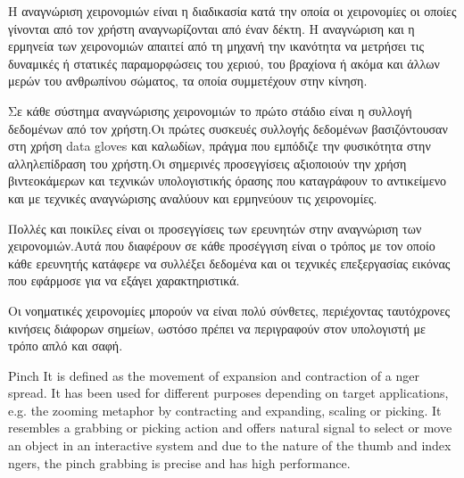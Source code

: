 
H αναγνώριση χειρονομιών είναι η διαδικασία κατά την οποία οι χειρονομίες οι οποίες γίνονται από τον χρήστη αναγνωρίζονται από έναν δέκτη. Η αναγνώριση και η ερμηνεία των χειρονομιών απαιτεί από τη μηχανή την ικανότητα να μετρήσει τις δυναμικές ή στατικές παραμορφώσεις του χεριού, του βραχίονα ή ακόμα και άλλων μερών του ανθρωπίνου σώματος, τα οποία συμμετέχουν στην κίνηση.

Σε κάθε σύστημα αναγνώρισης χειρονομιών το πρώτο στάδιο είναι η συλλογή δεδομένων από τον χρήστη.Οι πρώτες συσκευές συλλογής δεδομένων βασιζόντουσαν στη χρήση data gloves και καλωδίων, πράγμα που εμπόδιζε την φυσικότητα στην αλληλεπίδραση του χρήστη.Οι σημερινές προσεγγίσεις αξιοποιούν την χρήση βιντεοκάμερων και τεχνικών υπολογιστικής όρασης που καταγράφουν το αντικείμενο και με τεχνικές αναγνώρισης αναλύουν και ερμηνεύουν τις χειρονομίες.

Πολλές και ποικίλες είναι οι προσεγγίσεις των ερευνητών στην αναγνώριση των χειρονομιών.Αυτά που διαφέρουν σε κάθε προσέγγιση είναι ο τρόπος με τον οποίο κάθε ερευνητής κατάφερε να συλλέξει δεδομένα και οι τεχνικές επεξεργασίας εικόνας που εφάρμοσε για να εξάγει χαρακτηριστικά.

Οι νοηματικές χειρονομίες μπορούν να είναι πολύ σύνθετες, περιέχοντας ταυτόχρονες κινήσεις διάφορων σημείων, ωστόσο πρέπει να περιγραφούν στον υπολογιστή με τρόπο απλό και σαφή.

Pinch It is defined as the movement of expansion and contraction of a nger spread. It has been used for different purposes depending on target applications, e.g. the zooming metaphor by contracting and expanding, scaling or picking. It resembles a grabbing or picking action and offers natural signal to select or move an object in an interactive system and due to the nature of the thumb and index ngers, the pinch grabbing is precise and has high performance.



